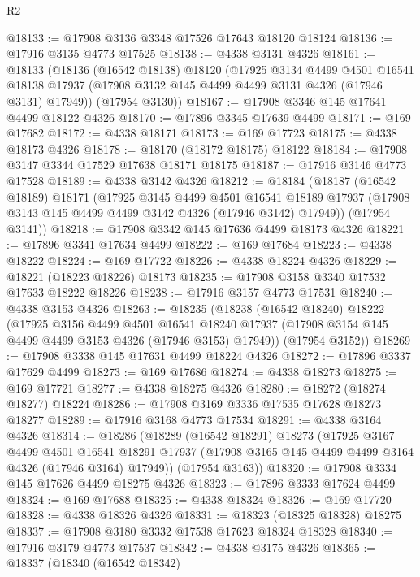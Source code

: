 \begin{lexlean}{R2}
\begin{coremodule}
@18133 := @17908 @3136 @3348 @17526 @17643 @18120 @18124
@18136 := @17916 @3135 @4773 @17525
@18138 := @4338 @3131 @4326
@18161 := @18133
    (@18136
      (@16542 @18138)
      @18120
      (@17925
        @3134
        @4499
        @4501
        @16541
        @18138
        @17937
        (@17908 @3132 @145 @4499 @4499 @3131 @4326 (@17946 @3131) @17949))
      (@17954 @3130))
@18167 := @17908 @3346 @145 @17641 @4499 @18122 @4326
@18170 := @17896 @3345 @17639 @4499
@18171 := @169 @17682
@18172 := @4338 @18171
@18173 := @169 @17723
@18175 := @4338 @18173 @4326
@18178 := @18170 (@18172 @18175) @18122
@18184 := @17908 @3147 @3344 @17529 @17638 @18171 @18175
@18187 := @17916 @3146 @4773 @17528
@18189 := @4338 @3142 @4326
@18212 := @18184
    (@18187
      (@16542 @18189)
      @18171
      (@17925
        @3145
        @4499
        @4501
        @16541
        @18189
        @17937
        (@17908 @3143 @145 @4499 @4499 @3142 @4326 (@17946 @3142) @17949))
      (@17954 @3141))
@18218 := @17908 @3342 @145 @17636 @4499 @18173 @4326
@18221 := @17896 @3341 @17634 @4499
@18222 := @169 @17684
@18223 := @4338 @18222
@18224 := @169 @17722
@18226 := @4338 @18224 @4326
@18229 := @18221 (@18223 @18226) @18173
@18235 := @17908 @3158 @3340 @17532 @17633 @18222 @18226
@18238 := @17916 @3157 @4773 @17531
@18240 := @4338 @3153 @4326
@18263 := @18235
    (@18238
      (@16542 @18240)
      @18222
      (@17925
        @3156
        @4499
        @4501
        @16541
        @18240
        @17937
        (@17908 @3154 @145 @4499 @4499 @3153 @4326 (@17946 @3153) @17949))
      (@17954 @3152))
@18269 := @17908 @3338 @145 @17631 @4499 @18224 @4326
@18272 := @17896 @3337 @17629 @4499
@18273 := @169 @17686
@18274 := @4338 @18273
@18275 := @169 @17721
@18277 := @4338 @18275 @4326
@18280 := @18272 (@18274 @18277) @18224
@18286 := @17908 @3169 @3336 @17535 @17628 @18273 @18277
@18289 := @17916 @3168 @4773 @17534
@18291 := @4338 @3164 @4326
@18314 := @18286
    (@18289
      (@16542 @18291)
      @18273
      (@17925
        @3167
        @4499
        @4501
        @16541
        @18291
        @17937
        (@17908 @3165 @145 @4499 @4499 @3164 @4326 (@17946 @3164) @17949))
      (@17954 @3163))
@18320 := @17908 @3334 @145 @17626 @4499 @18275 @4326
@18323 := @17896 @3333 @17624 @4499
@18324 := @169 @17688
@18325 := @4338 @18324
@18326 := @169 @17720
@18328 := @4338 @18326 @4326
@18331 := @18323 (@18325 @18328) @18275
@18337 := @17908 @3180 @3332 @17538 @17623 @18324 @18328
@18340 := @17916 @3179 @4773 @17537
@18342 := @4338 @3175 @4326
@18365 := @18337
    (@18340
      (@16542 @18342)

\end{coremodule}
\end{lexlean}
